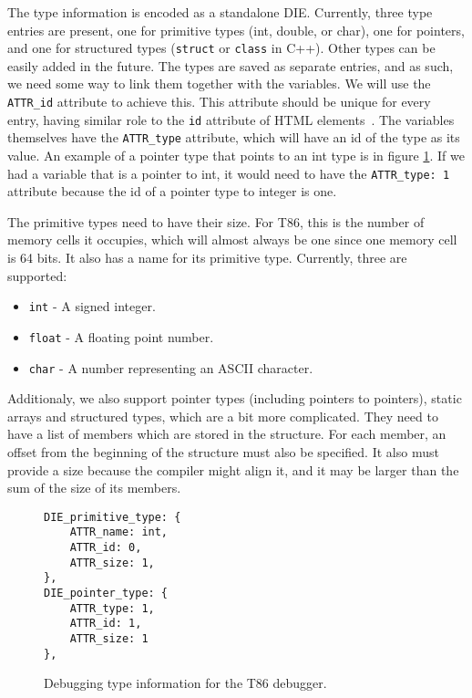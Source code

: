 The type information is encoded as a standalone DIE. Currently, three type
entries are present, one for primitive types (int, double, or char), one for
pointers, and one for structured types (\texttt{struct} or \texttt{class} in
C++). Other types can be easily added in the future. The types are saved as
separate entries, and as such, we need some way to link them together with the
variables. We will use the \verb|ATTR_id| attribute to achieve this. This
attribute should be unique for every entry, having similar role to the
\texttt{id} attribute of HTML elements~\cite{html4}. The variables themselves
have the \verb|ATTR_type| attribute, which will have an id of the type as its
value. An example of a pointer type that points to an int type is in figure
\ref{fig:t86dbg-types}. If we had a variable that is a pointer to int, it would
need to have the \verb|ATTR_type: 1| attribute because the id of a pointer type
to integer is one.

The primitive types need to have their size. For T86, this is the number of
memory cells it occupies, which will almost always be one since one memory cell
is 64 bits. It also has a name for its primitive type. Currently, three
are supported:
\begin{itemize}
    \item \texttt{int} - A signed integer.
    \item \texttt{float} - A floating point number.
    \item \texttt{char} - A number representing an ASCII character.
\end{itemize}

Additionaly, we also support pointer types (including pointers to pointers),
static arrays and structured types, which are a bit more complicated. They need
to have a list of members which are stored in the structure. For each member,
an offset from the beginning of the structure must also be specified. It also
must provide a size because the compiler might align it, and it may be larger
than the sum of the size of its members.

\begin{figure}
    \begin{lstlisting}
DIE_primitive_type: {
    ATTR_name: int,
    ATTR_id: 0,
    ATTR_size: 1,
},
DIE_pointer_type: {
    ATTR_type: 1,
    ATTR_id: 1,
    ATTR_size: 1
},
    \end{lstlisting}
    \caption{Debugging type information for the T86 debugger.}
    \label{fig:t86dbg-types}
\end{figure}

